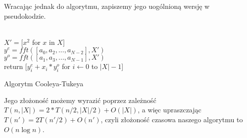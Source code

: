 Wracając jednak do algorytmu, zapiszemy jego uogólnioną wersję w pseudokodzie.\\
\begin{algorithm}[H]
  \DontPrintSemicolon


  \\

  $X' = [x^2$ for $x$ in $X]$\\
  $y^e = fft([a_0, a_2, ..., a_{N - 2}], X')$\\
  $y^o = fft([a_1, a_3, ..., a_{N - 1}], X')$ \\

  return [$y_i^e + x_i*y_i^o$ for $i \leftarrow 0$ to $|X| - 1$]

  \caption{Algorytm Cooleya-Tukeya}
  \label{alg-fft-cooley-tukey}
\end{algorithm}
Jego złożoność możemy wyrazić poprzez zależność $T(n, |X|) = 2*T(n/2, |X|/2) + O(|X|)$,
a więc upraszczając $T(n') = 2T(n'/2) + O(n')$, czyli złożoność czasowa naszego algorytmu to $O(n\log{n})$.
